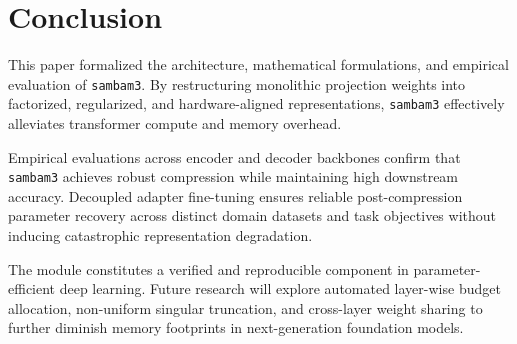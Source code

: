 \section{Conclusion}
This paper formalized the architecture, mathematical formulations, and empirical evaluation of \texttt{sambam3}. By restructuring monolithic projection weights into factorized, regularized, and hardware-aligned representations, \texttt{sambam3} effectively alleviates transformer compute and memory overhead.

Empirical evaluations across encoder and decoder backbones confirm that \texttt{sambam3} achieves robust compression while maintaining high downstream accuracy. Decoupled adapter fine-tuning ensures reliable post-compression parameter recovery across distinct domain datasets and task objectives without inducing catastrophic representation degradation.

The module constitutes a verified and reproducible component in parameter-efficient deep learning. Future research will explore automated layer-wise budget allocation, non-uniform singular truncation, and cross-layer weight sharing to further diminish memory footprints in next-generation foundation models.

